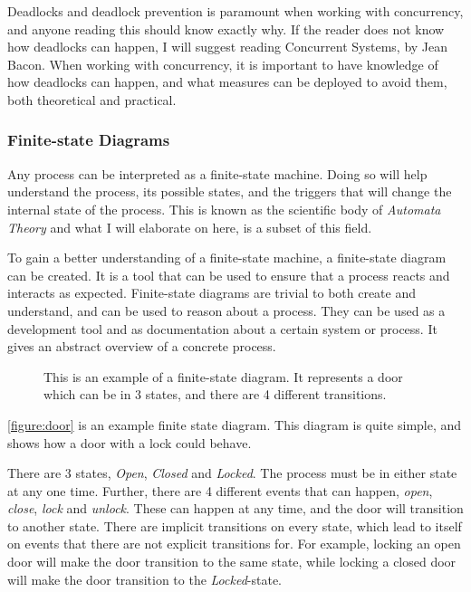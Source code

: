 \documentclass[a4paper]{article}
\begin{document}
Deadlocks and deadlock prevention is paramount when working with concurrency, and anyone reading this should know exactly why. If the reader does not know how deadlocks can happen, I will suggest reading Concurrent Systems, by Jean Bacon\cite{opac-b1093825}. When working with concurrency, it is important to have knowledge of how deadlocks can happen, and what measures can be deployed to avoid them, both theoretical and practical.


\subsubsection{Finite-state Diagrams}
Any process can be interpreted as a finite-state machine. Doing so will help understand the process, its possible states, and the triggers that will change the internal state of the process. This is known as the scientific body of \textit{Automata Theory} and what I will elaborate on here, is a subset of this field.

To gain a better understanding of a finite-state machine, a finite-state diagram can be created. It is a tool that can be used to ensure that a process reacts and interacts as expected. Finite-state diagrams are trivial to both create and understand, and can be used to reason about a process. They can be used as a development tool and as documentation about a certain system or process. It gives an abstract overview of a concrete process.\\

\begin{figure}
	\begin{adjustwidth}{-0.5in}{-0.5in}
    \centering
    \def\svgwidth{\columnwidth}
    
  	\caption{This is an example of a finite-state diagram. It represents a door which can be in 3 states, and there are 4 different transitions.}
	\label{figure:door}
	\end{adjustwidth}
\end{figure}

\autoref{figure:door} is an example finite state diagram. This diagram is quite simple, and shows how a door with a lock could behave.

There are 3 states, \textit{Open}, \textit{Closed} and \textit{Locked}. The process must be in either state at any one time. Further, there are 4 different events that can happen, \textit{open}, \textit{close}, \textit{lock} and \textit{unlock}. These can happen at any time, and the door will transition to another state. There are implicit transitions on every state, which lead to itself on events that there are not explicit transitions for. For example, locking an open door will make the door transition to the same state, while locking a closed door will make the door transition to the \textit{Locked}-state.\\
\end{document}
